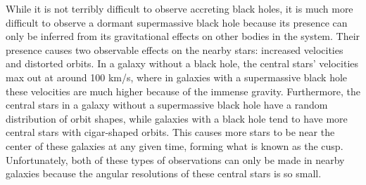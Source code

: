 \documentclass[12pt]{article}
\begin{document}
While it is not terribly difficult to observe accreting black holes, it is much
more difficult to observe a dormant supermassive black hole because its presence
can only be inferred from its gravitational effects on other bodies in the
system.  Their presence causes two observable effects on the nearby stars:
increased velocities and distorted orbits.  In a galaxy without a black hole,
the central stars' velocities max out at around 100 km/s, where in galaxies with
a supermassive black hole these velocities are much higher because of the
immense gravity.  Furthermore, the central stars in a galaxy without a
supermassive black hole have a random distribution of orbit shapes, while
galaxies with a black hole tend to have more central stars with cigar-shaped
orbits.  This causes more stars to be near the center of these galaxies at any
given time, forming what is known as the cusp.  Unfortunately, both of these
types of observations can only be made in nearby galaxies because the angular
resolutions of these central stars is so small.
\end{document}
